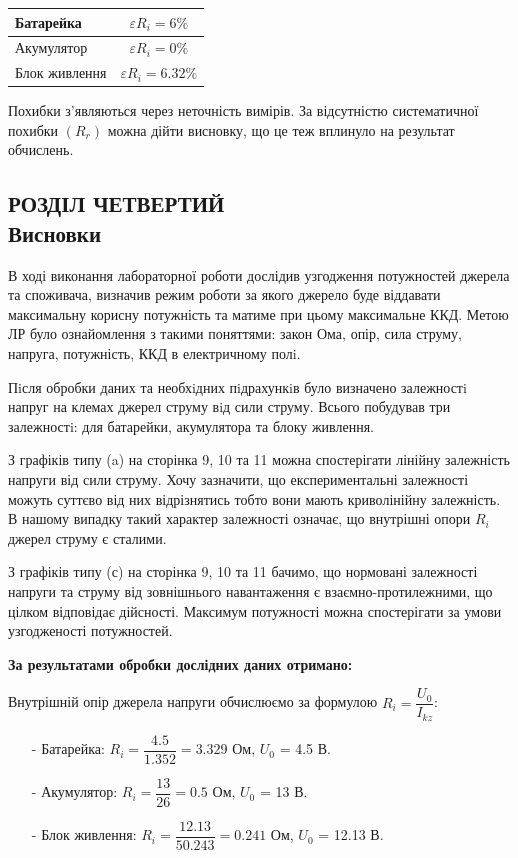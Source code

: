 \documentclass[a4paper,12pt]{article}
\newcommand{\ri}{R_i}
\newcommand{\uo}{U_0}
\newcommand{\ik}{I_{kz}}
\begin{document}
	\begin{table}[h!]
		\centering
		\begin{tabular}{|l|c|}
			\hline
			Батарейка     & $\varepsilon\ri=6\%$ \\ \hline
			Акумулятор    & $\varepsilon\ri=0\%$  \\ \hline
			Блок живлення & $\varepsilon\ri=6.32\%$ \\ \hline
		\end{tabular}
	\end{table}
	Похибки з'являються через неточність вимірів. За відсутністю систематичної похибки $(R_r)$ можна дійти висновку, що це теж вплинуло на результат обчислень.
	
	
	
	
\newpage
	\begin{center}
		\section* {РОЗДІЛ ЧЕТВЕРТИЙ\\Висновки}
	\end{center}
	В ході виконання лабораторної роботи дослідив узгодження потужностей джерела та споживача, визначив режим роботи за якого джерело буде віддавати максимальну корисну потужність та матиме при цьому максимальне ККД. Метою ЛР було ознайомлення з такими поняттями: закон Ома, опір, сила струму, напруга, потужність, ККД в електричному полi. 
	
	Пiсля обробки даних та необхiдних пiдрахункiв було визначено залежностi напруг на клемах джерел струму вiд сили струму. Всього побудував три залежностi: для батарейки, акумулятора та блоку живлення.
	
	З графіків типу (a) на сторінка 9, 10 та 11 можна спостерігати лінійну залежність напруги від сили струму. Хочу зазначити, що експериментальні залежності можуть суттєво від них відрізнятись тобто вони мають криволінійну залежність. В нашому випадку такий характер залежності означає, що внутрішні опори $\ri$ джерел струму є сталими. 
	
	З графіків типу (с) на сторінка 9, 10 та 11 бачимо, що нормовані залежності напруги та струму від зовнішнього навантаження є взаємно-протилежними, що цілком відповідає дійсності. Максимум потужності можна спостерігати за умови узгодженості потужностей. \\
	
	
	\begin{center}
		\textbf{За результатами обробки дослідних даних отримано:}
	\end{center}
	Внутрішній опір джерела напруги обчислюємо за формулою $\ri=\dfrac{\uo}{\ik}$:
	\begin{enumerate}
		\item[-] Батарейка: $\ri=\dfrac{4.5}{1.352}=3.329$ Ом, $\uo$ = 4.5 В.
		\item[-] Акумулятор: $\ri=\dfrac{13}{26}=0.5$ Ом, $\uo$ = 13 В.
		\item[-] Блок живлення: $\ri=\dfrac{12.13}{50.243}=0.241$ Ом, $\uo$ = 12.13 В.
	\end{enumerate}
	
\end{document}

